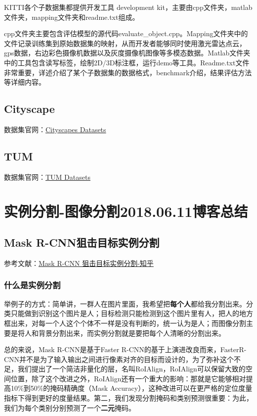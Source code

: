 KITTI各个子数据集都提供开发工具 development kit，主要由cpp文件夹，matlab文件夹，mapping文件夹和readme.txt组成。

cpp文件夹主要包含评估模型的源代码evaluate\_object.cpp。Mapping文件夹中的文件记录训练集到原始数据集的映射，从而开发者能够同时使用激光雷达点云，gps数据，右边彩色摄像机数据以及灰度摄像机图像等多模态数据。Matlab文件夹中的工具包含读写标签，绘制2D/3D标注框，运行demo等工具。Readme.txt文件非常重要，详述介绍了某个子数据集的数据格式，benchmark介绍，结果评估方法等详细内容。

\subsection{Cityscape}

数据集官网：\href{https://www.cityscapes-dataset.com/}{Cityscapes Datasets}



\subsection{TUM}

数据集官网：\href{https://vision.in.tum.de/data/datasets}{TUM Datasets}

\section{实例分割-图像分割2018.06.11博客总结}

\subsection{Mask R-CNN狙击目标实例分割}

参考文献：\href{https://zhuanlan.zhihu.com/p/26047813}{Mask R-CNN 狙击目标实例分割-知乎}

\subsubsection{什么是实例分割}

举例子的方式：简单讲，一群人在图片里面，我希望把\textbf{每个人}都给我分割出来。分类只能做到识别这个图片是人；目标检测只能检测到这个图片里有人，把人的地方框出来，对每一个人这个个体不一样是没有判断的，统一认为是人；而图像分割主要是将人和背景分割出来，而实例分割就是要把每个人清晰的分割出来。

总的来说，Mask R-CNN是基于Faster R-CNN的基于上演进改良而来，FasterR-CNN并不是为了输入输出之间进行像素对齐的目标而设计的，为了弥补这个不足，我们提出了一个简洁非量化的层，名叫RoIAlign，RoIAlign可以保留大致的空间位置，除了这个改进之外，RoIAlign还有一个重大的影响：那就是它能够相对提高10\%到50\%的掩码精确度（Mask Accuracy），这种改进可以在更严格的定位度量指标下得到更好的度量结果。第二，我们发现分割掩码和类别预测很重要：为此，我们为每个类别分别预测了一个\textbf{二元}掩码。


